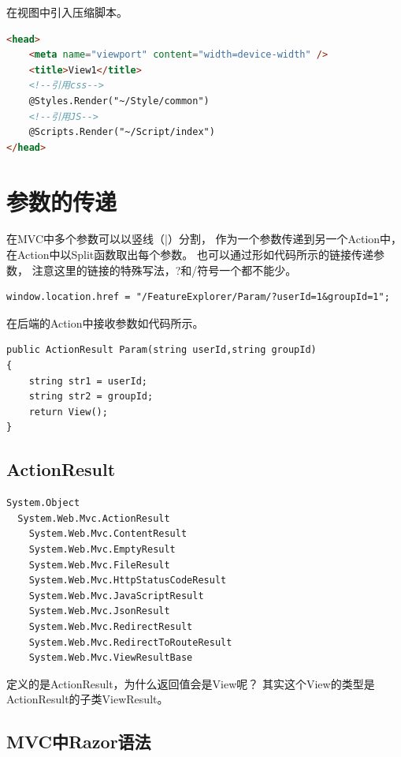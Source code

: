 \documentclass{book}
\begin{document}
在视图中引入压缩脚本。

\begin{lstlisting}[language=HTML]
<head>
    <meta name="viewport" content="width=device-width" />
    <title>View1</title>
    <!--引用css-->
 	@Styles.Render("~/Style/common")
    <!--引用JS-->
 	@Scripts.Render("~/Script/index")
</head>
\end{lstlisting}

\section{参数的传递}

在MVC中多个参数可以以竖线（|）分割，
作为一个参数传递到另一个Action中，
在Action中以Split函数取出每个参数。
也可以通过形如代码所示的链接传递参数，
注意这里的链接的特殊写法，?和/符号一个都不能少。

\begin{lstlisting}[language=VBScript]
window.location.href = "/FeatureExplorer/Param/?userId=1&groupId=1";
\end{lstlisting}

在后端的Action中接收参数如代码所示。

\begin{lstlisting}[language={[Sharp]C}]
public ActionResult Param(string userId,string groupId)
{
    string str1 = userId;
    string str2 = groupId;
    return View();
}
\end{lstlisting}


\subsection{ActionResult}


\begin{lstlisting}[language={[Sharp]C}]
System.Object 
  System.Web.Mvc.ActionResult
    System.Web.Mvc.ContentResult
    System.Web.Mvc.EmptyResult
    System.Web.Mvc.FileResult
    System.Web.Mvc.HttpStatusCodeResult
    System.Web.Mvc.JavaScriptResult
    System.Web.Mvc.JsonResult
    System.Web.Mvc.RedirectResult
    System.Web.Mvc.RedirectToRouteResult
    System.Web.Mvc.ViewResultBase
\end{lstlisting}

定义的是ActionResult，为什么返回值会是View呢？
其实这个View的类型是ActionResult的子类ViewResult。

\subsection{MVC中Razor语法}
\end{document}

